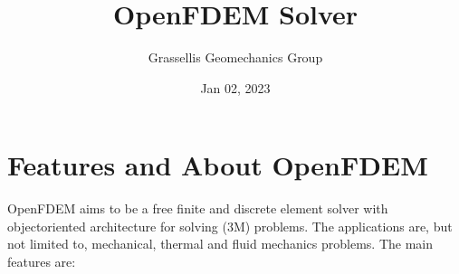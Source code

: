 \documentclass[letterpaper,10pt,english]{sphinxmanual}
\title{OpenFDEM Solver}
\date{Jan 02, 2023}
\author{Grasselli\textquotesingle{}s Geomechanics Group}
\begin{document}
\pagestyle{empty}
\sphinxmaketitle
\pagestyle{plain}
\sphinxtableofcontents
\pagestyle{normal}
\label{\detokenize{index::doc}}



\chapter{Features and About OpenFDEM}
\label{\detokenize{rst_about_project/intro:features-and-about-openfdem}}\label{\detokenize{rst_about_project/intro::doc}}
OpenFDEM aims to be a free finite and discrete element solver with object\sphinxhyphen{}oriented architecture for solving
 (3M) problems. The applications are,
but not limited to, mechanical, thermal and fluid mechanics problems. The main features are:
\end{document}
